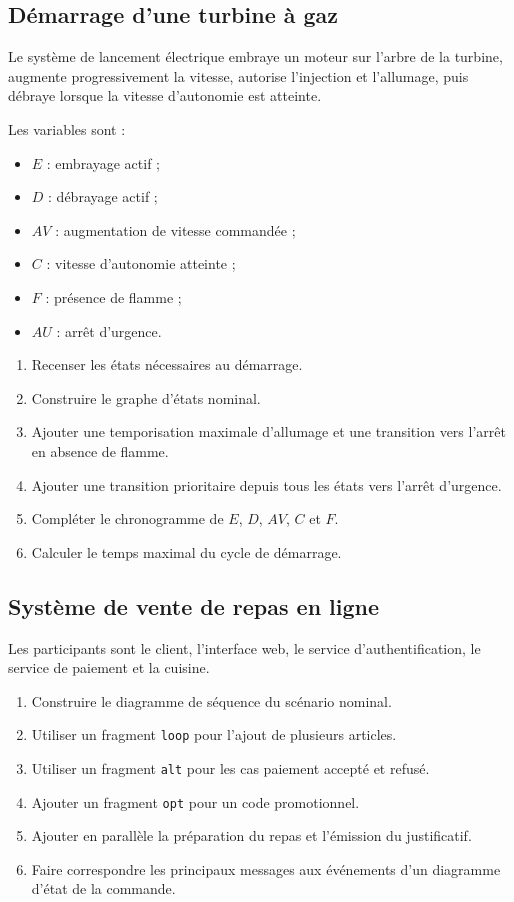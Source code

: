 \subsection{Démarrage d'une turbine à gaz}

Le système de lancement électrique embraye un moteur sur l'arbre de la turbine, augmente progressivement la vitesse, autorise l'injection et l'allumage, puis débraye lorsque la vitesse d'autonomie est atteinte.

Les variables sont :
\begin{itemize}
  \item $E$ : embrayage actif ;
  \item $D$ : débrayage actif ;
  \item $AV$ : augmentation de vitesse commandée ;
  \item $C$ : vitesse d'autonomie atteinte ;
  \item $F$ : présence de flamme ;
  \item $AU$ : arrêt d'urgence.
\end{itemize}

\begin{enumerate}
  \item Recenser les états nécessaires au démarrage.
  \item Construire le graphe d'états nominal.
  \item Ajouter une temporisation maximale d'allumage et une transition vers l'arrêt en absence de flamme.
  \item Ajouter une transition prioritaire depuis tous les états vers l'arrêt d'urgence.
  \item Compléter le chronogramme de $E$, $D$, $AV$, $C$ et $F$.
  \item Calculer le temps maximal du cycle de démarrage.
\end{enumerate}


\subsection{Système de vente de repas en ligne}

Les participants sont le client, l'interface web, le service d'authentification, le service de paiement et la cuisine.

\begin{enumerate}
  \item Construire le diagramme de séquence du scénario nominal.
  \item Utiliser un fragment \texttt{loop} pour l'ajout de plusieurs articles.
  \item Utiliser un fragment \texttt{alt} pour les cas paiement accepté et refusé.
  \item Ajouter un fragment \texttt{opt} pour un code promotionnel.
  \item Ajouter en parallèle la préparation du repas et l'émission du justificatif.
  \item Faire correspondre les principaux messages aux événements d'un diagramme d'état de la commande.
\end{enumerate}

